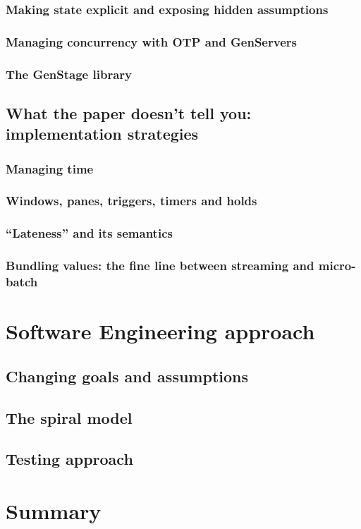 \subsubsection{Making state explicit and exposing hidden assumptions}

\subsubsection{Managing concurrency with OTP and GenServers}

\subsubsection{The GenStage library}

\subsection{What the paper doesn't tell you: implementation strategies}

\subsubsection{Managing time}

\subsubsection{Windows, panes, triggers, timers and holds}

\subsubsection{``Lateness'' and its semantics}

\subsubsection{Bundling values: the fine line between streaming and micro-batch}

\section{Software Engineering approach}\label{sec:prep:softeng}

\subsection{Changing goals and assumptions}

\subsection{The spiral model}

\subsection{Testing approach}

\section{Summary}\label{sec:prep:summary}